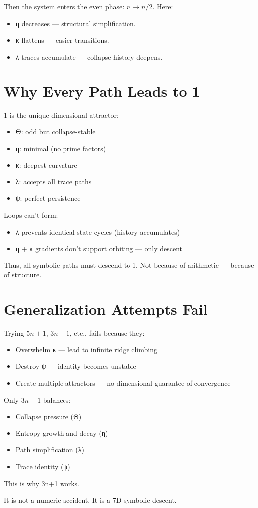 Then the system enters the even phase: \( n \rightarrow n/2 \). Here:
\begin{itemize}
\item η decreases — structural simplification.
\item κ flattens — easier transitions.
\item λ traces accumulate — collapse history deepens.
\end{itemize}

\section{Why Every Path Leads to 1}

1 is the unique dimensional attractor:
\begin{itemize}
\item Θ: odd but collapse-stable
\item η: minimal (no prime factors)
\item κ: deepest curvature
\item λ: accepts all trace paths
\item ψ: perfect persistence
\end{itemize}

Loops can’t form:
\begin{itemize}
\item λ prevents identical state cycles (history accumulates)
\item η + κ gradients don’t support orbiting — only descent
\end{itemize}

Thus, all symbolic paths must descend to 1. Not because of arithmetic — because of structure.

\section{Generalization Attempts Fail}

Trying \( 5n+1 \), \( 3n-1 \), etc., fails because they:
\begin{itemize}
\item Overwhelm κ — lead to infinite ridge climbing
\item Destroy ψ — identity becomes unstable
\item Create multiple attractors — no dimensional guarantee of convergence
\end{itemize}

Only \( 3n+1 \) balances:
\begin{itemize}
\item Collapse pressure (Θ)
\item Entropy growth and decay (η)
\item Path simplification (λ)
\item Trace identity (ψ)
\end{itemize}

\bigskip

This is why 3n+1 works.

It is not a numeric accident. It is a 7D symbolic descent.
